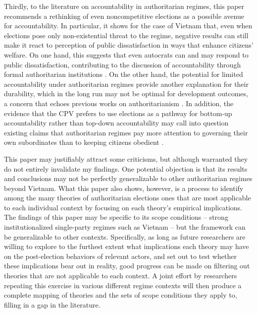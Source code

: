 \documentclass[12pt]{article}
\newcommand{\1}{\mathbbm{1}}
\begin{document}
Thirdly, to the literature on accountability in authoritarian regimes, this paper recommends a rethinking of even noncompetitive elections as a possible avenue for accountability. In particular, it shows for the case of Vietnam that, even when elections pose only non-existential threat to the regime, negative results can still make it react to perception of public dissatisfaction in ways that enhance citizens' welfare. On one hand, this suggests that even autocrats can and may respond to public dissatisfaction, contributing to the discussion of accountability through formal authoritarian institutions  \citep[e.g.][]{Miller2015,Lorentzen2013,Manion2014}. On the other hand, the potential for limited accountability under authoritarian regimes provide another explanation for their durability, which in the long run may not be optimal for development outcomes, a concern that echoes previous works on authoritarianism \citep[e.g.][]{BoixSvolik2013, GandhiPrzeworski2007}. In addition, the evidence that the CPV prefers to use elections as a pathway for bottom-up accountability rather than top-down accountability may call into question existing claims that authoritarian regimes pay more attention to governing their own subordinates than to keeping citizens obedient \citep[e.g.][]{Svolik2012}.

This paper may justifiably attract some criticisms, but although warranted they do not entirely invalidate my findings. One potential objection is that its results and conclusions may not be perfectly generalizable to other authoritarian regimes beyond Vietnam. What this paper also shows, however, is a process to identify among the many theories of authoritarian elections ones that are most applicable to each individual context by focusing on each theory's empirical implications. The findings of this paper may be specific to its scope conditions -- strong institutionalized single-party regimes such as Vietnam -- but the framework can be generalizable to other contexts. Specifically, as long as future researchers are willing to explore to the furthest extent what implications each theory may have on the post-election behaviors of relevant actors, and set out to test whether these implications bear out in reality, good progress can be made on filtering out theories that are not applicable to each context. A joint effort by researchers repeating this exercise in various different regime contexts will then produce a complete mapping of theories and the sets of scope conditions they apply to, filling in a gap in the literature.
\end{document}
